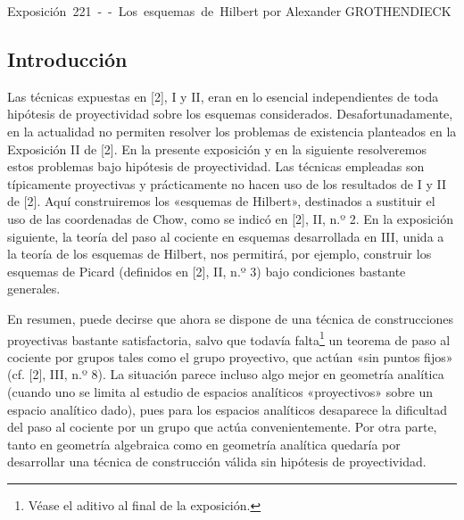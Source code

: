 \unit{Exposición 221 -- Los esquemas de Hilbert}
%
  {por Alexander GROTHENDIECK}

\subsection*{Introducción}

Las técnicas expuestas en [2], I y II, eran en lo esencial independientes de
toda hipótesis de proyectividad sobre los esquemas considerados.
Desafortunadamente, en la actualidad no permiten resolver los problemas de
existencia planteados en la Exposición II de [2]. En la presente exposición y
en la siguiente resolveremos estos problemas bajo hipótesis de proyectividad.
Las técnicas empleadas son típicamente proyectivas y prácticamente no hacen
uso de los resultados de I y II de [2]. Aquí construiremos los «esquemas de
Hilbert», destinados a sustituir el uso de las coordenadas de Chow, como se
indicó en [2], II, n.º 2. En la exposición siguiente, la teoría del paso al
cociente en esquemas desarrollada en III, unida a la teoría de los esquemas de
Hilbert, nos permitirá, por ejemplo, construir los esquemas de Picard
(definidos en [2], II, n.º 3) bajo condiciones bastante generales.

En resumen, puede decirse que ahora se dispone de una técnica de construcciones
proyectivas bastante satisfactoria, salvo que todavía
falta\footnote{Véase el aditivo al final de la exposición.} un teorema de paso
al cociente por grupos tales como el grupo proyectivo, que actúan «sin puntos
fijos» (cf. [2], III, n.º 8). La situación parece incluso algo mejor en
geometría analítica (cuando uno se limita al estudio de espacios analíticos
«proyectivos» sobre un espacio analítico dado), pues para los espacios
analíticos desaparece la dificultad del paso al cociente por un grupo que
actúa convenientemente. Por otra parte, tanto en geometría algebraica como en
geometría analítica quedaría por desarrollar una técnica de construcción
válida sin hipótesis de proyectividad.


